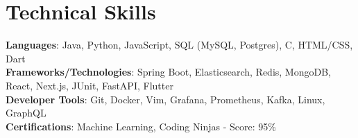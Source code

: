 \documentclass[letterpaper,11pt]{article}
\makeatletter
\newcommand{\resumeItem}[1]{
  \item\small{
    {#1 \vspace{-2pt}}
  }
}
\newcommand{\resumeProjectHeading}[2]{
    \item
    \begin{tabular*}{0.97\textwidth}{l@{\extracolsep{\fill}}r}
      \small#1 & #2 \\
    \end{tabular*}\vspace{-7pt}
}
\newcommand{\resumeSubHeadingListEnd}{\end{itemize}}
\newcommand{\resumeItemListStart}{\begin{itemize}}
\newcommand{\resumeItemListEnd}{\end{itemize}\vspace{-5pt}}
\makeatother
\begin{document}





%
\section{Technical Skills}
\begin{itemize}[leftmargin=0.15in, label={}]
	\small{\item{
		\textbf{Languages}{: Java, Python, JavaScript, SQL (MySQL, Postgres), C, HTML/CSS, Dart} \\
		\textbf{Frameworks/Technologies}{: Spring Boot, Elasticsearch, Redis, MongoDB, React, Next.js, JUnit, FastAPI, Flutter} \\
		\textbf{Developer Tools}{: Git, Docker, Vim, Grafana, Prometheus, Kafka, Linux, GraphQL} \\
		\textbf{Certifications}{: Machine Learning, Coding Ninjas - Score: 95\%}
	}}
\end{itemize}


\end{document}
